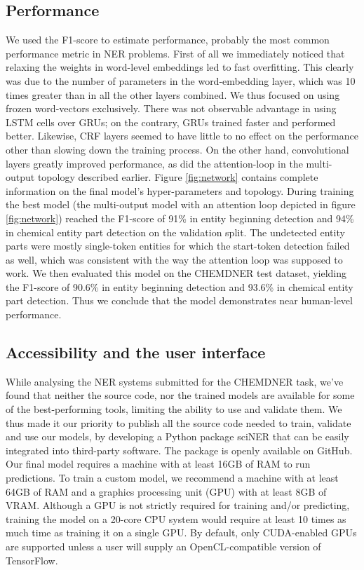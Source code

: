 \documentclass[twocolumn]{bmcart}%
\begin{document}
\subsection*{Performance}

We used the F1-score to estimate performance, probably the most common performance metric in NER problems. 
First of all we immediately noticed that relaxing the weights in word-level embeddings led to fast overfitting.
This clearly was due to the number of parameters in the word-embedding layer, which was 10 times greater than in all the other layers combined.
We thus focused on using frozen word-vectors exclusively.
There was not observable advantage in using LSTM cells over GRUs; on the contrary, GRUs trained faster and performed better.
Likewise, CRF layers seemed to have little to no effect on the performance other than slowing down the training process.
On the other hand, convolutional layers greatly improved performance, as did the attention-loop in the multi-output topology described earlier.
Figure \ref{fig:network} contains complete information on the final model's hyper-parameters and topology.
During training the best model (the multi-output model with an attention loop depicted in figure \ref{fig:network}) reached the F1-score of 91\% in entity beginning detection and 94\% in chemical entity part detection on the validation split.
The undetected entity parts were mostly single-token entities for which the start-token detection failed as well, which was consistent with the way the attention loop was supposed to work.
We then evaluated this model on the CHEMDNER test dataset, yielding the F1-score of 90.6\% in entity beginning detection and 93.6\% in chemical entity part detection.
Thus we conclude that the model demonstrates near human-level performance.
 
\subsection*{Accessibility and the user interface}

While analysing the NER systems submitted for the CHEMDNER task, we've found that neither the source code, nor the trained models are available for some of the best-performing tools, limiting the ability to use and validate them.
We thus made it our priority to publish all the source code needed to train, validate and use our models, by developing a Python package sciNER that can be easily integrated into third-party software.
The package is openly available on GitHub.
Our final model requires a machine with at least 16GB of RAM to run predictions. 
To train a custom model, we recommend a machine with at least 64GB of RAM and a graphics processing unit (GPU) with at least 8GB of VRAM. 
Although a GPU is not strictly required for training and/or predicting, training the model on a 20-core CPU system would require at least 10 times as much time as training it on a single GPU.
By default, only CUDA-enabled GPUs are supported unless a user will supply an OpenCL-compatible version of TensorFlow.
\end{document}
